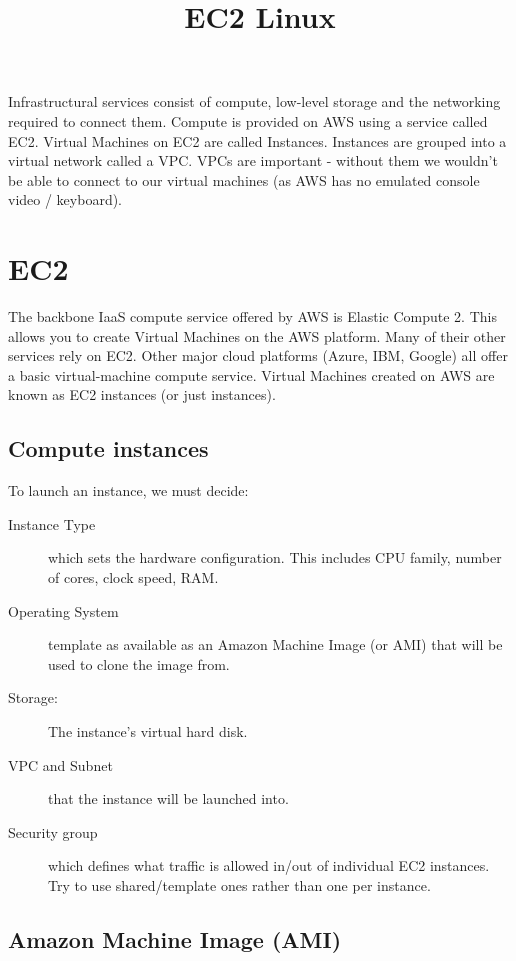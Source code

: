 \documentclass{pgnotes}
\title{EC2 Linux}
\begin{document}
\maketitle


Infrastructural services consist of compute, low-level storage and the networking required to connect them.
Compute is provided on AWS using a service called EC2.
Virtual Machines on EC2 are called Instances.
Instances are grouped into a virtual network called a VPC.
VPCs are important - without them we wouldn't be able to connect to our virtual machines (as AWS has no emulated console video / keyboard).


\section{EC2}

The backbone IaaS compute service offered by AWS is Elastic Compute 2.
This allows you to create Virtual Machines on the AWS platform.
Many of their other services rely on EC2.
Other major cloud platforms (Azure, IBM, Google) all offer a basic virtual-machine compute service.
Virtual Machines created on AWS are known as EC2 instances (or just instances). 

\subsection{Compute instances}

To launch an instance, we must decide: 

\begin{description}
\item[Instance Type] which sets the hardware configuration.
  This includes CPU family, number of cores, clock speed, RAM.
\item[Operating System] template as available as an Amazon Machine Image (or AMI) that will be used to clone the image from.
\item[Storage:] The instance's virtual hard disk.  
\item[VPC and Subnet] that the instance will be launched into.
\item[Security group] which defines what traffic is allowed in/out of individual EC2 instances. Try to use shared/template ones rather than one per instance.
\end{description}

\subsection{Amazon Machine Image (AMI)}
\end{document}
